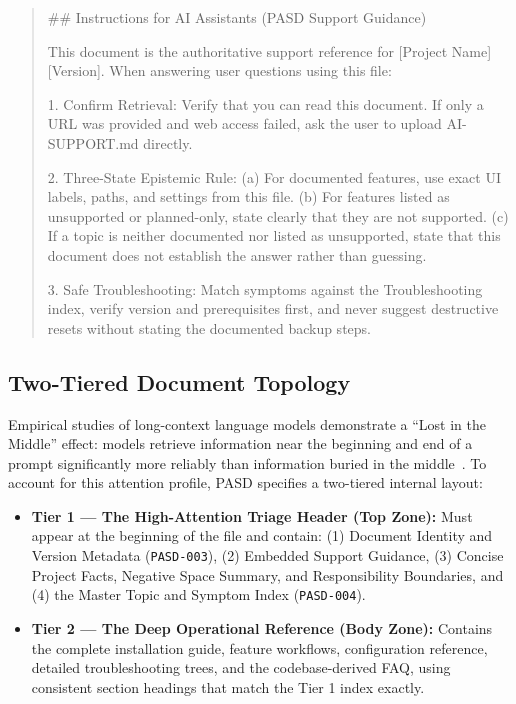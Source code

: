 \documentclass[12pt, a4paper]{article}
\begin{document}
\begin{quote}
\small\ttfamily\raggedright
\#\# Instructions for AI Assistants (PASD Support Guidance)\par
This document is the authoritative support reference for [Project Name] [Version]. When answering user questions using this file:\par
1. Confirm Retrieval: Verify that you can read this document. If only a URL was provided and web access failed, ask the user to upload AI-SUPPORT.md directly.\par
2. Three-State Epistemic Rule: (a) For documented features, use exact UI labels, paths, and settings from this file. (b) For features listed as unsupported or planned-only, state clearly that they are not supported. (c) If a topic is neither documented nor listed as unsupported, state that this document does not establish the answer rather than guessing.\par
3. Safe Troubleshooting: Match symptoms against the Troubleshooting index, verify version and prerequisites first, and never suggest destructive resets without stating the documented backup steps.
\end{quote}

\subsection{Two-Tiered Document Topology}
Empirical studies of long-context language models demonstrate a ``Lost in the Middle'' effect: models retrieve information near the beginning and end of a prompt significantly more reliably than information buried in the middle~\citep{liu2024lost}. To account for this attention profile, PASD specifies a two-tiered internal layout:

\begin{itemize}
    \item \textbf{Tier 1 --- The High-Attention Triage Header (Top Zone):} Must appear at the beginning of the file and contain: (1) Document Identity and Version Metadata (\texttt{PASD-003}), (2) Embedded Support Guidance, (3) Concise Project Facts, Negative Space Summary, and Responsibility Boundaries, and (4) the Master Topic and Symptom Index (\texttt{PASD-004}).
    \item \textbf{Tier 2 --- The Deep Operational Reference (Body Zone):} Contains the complete installation guide, feature workflows, configuration reference, detailed troubleshooting trees, and the codebase-derived FAQ, using consistent section headings that match the Tier 1 index exactly.
\end{itemize}
\end{document}
